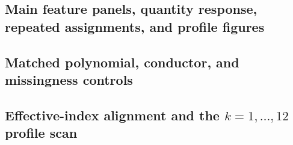\documentclass[12pt,reqno]{amsart}
\numberwithin{equation}{section}
\theoremstyle{plain}
\theoremstyle{definition}
\theoremstyle{remark}
\begin{document}


\Needspace{0.28\textheight}
\subsection{Main feature panels, quantity response, repeated assignments, and profile figures}\mbox{}\par\smallskip



\Needspace{0.28\textheight}
\subsection{Matched polynomial, conductor, and missingness controls}\mbox{}\par\smallskip









\Needspace{0.28\textheight}
\subsection{Effective-index alignment and the $k=1,\ldots,12$ profile scan}\mbox{}\par\smallskip


\end{document}

